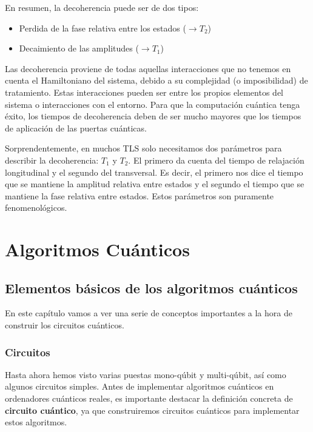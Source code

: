 \documentclass[a4paper,11pt]{book} %
\numberwithin{equation}{chapter}
\begin{document}
En resumen, la decoherencia puede ser de dos tipos:
\begin{itemize}
	\item Perdida de la fase relativa entre los estados ($\rightarrow T_2$)
	\item Decaimiento de las amplitudes ($\rightarrow T_1$)
\end{itemize}
Las decoherencia proviene de todas aquellas interacciones que no tenemos en cuenta el Hamiltoniano del sistema, debido a su complejidad (o imposibilidad) de tratamiento. Estas interacciones pueden ser entre los propios elementos del sistema o interacciones con el entorno. Para que la computación cuántica tenga éxito, los tiempos de decoherencia deben de ser mucho mayores que los tiempos de aplicación de las puertas cuánticas. 

Sorprendentemente, en muchos TLS solo necesitamos dos parámetros para describir la decoherencia: $T_1$ y $T_2$. El primero da cuenta del tiempo de relajación longitudinal y el segundo del transversal. Es decir, el primero nos dice el tiempo que se mantiene la amplitud relativa entre estados y el segundo el tiempo que se mantiene la fase relativa entre estados. Estos parámetros son puramente fenomenológicos.








	
	

\part{Algoritmos Cuánticos} \label{part_algoritmos}

\chapter{Elementos básicos de los algoritmos cuánticos}

En este capítulo vamos a ver una serie de conceptos importantes a la hora de construir los circuitos cuánticos.

	\section{Circuitos}
	
Hasta ahora hemos visto varias puestas mono-qúbit y multi-qúbit, así como algunos circuitos simples. 
Antes de implementar algoritmos cuánticos en ordenadores cuánticos reales, es importante destacar la definición concreta de \textbf{circuito cuántico}, ya que construiremos circuitos cuánticos para implementar estos algoritmos.
\end{document}
